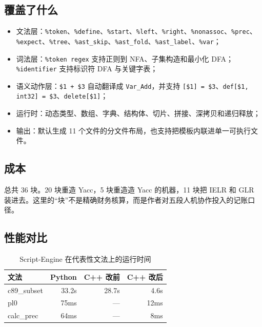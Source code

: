 \subsection{覆盖了什么}

\begin{itemize}
\item 文法层：\texttt{\%token}、\texttt{\%define}、\texttt{\%start}、\texttt{\%left}、\texttt{\%right}、\texttt{\%nonassoc}、\texttt{\%prec}、\texttt{\%expect}、\texttt{\%tree}、\texttt{\%ast\_skip}、\texttt{\%ast\_fold}、\texttt{\%ast\_label}、\texttt{\%var}；
\item 词法层：\texttt{\%token regex} 支持正则到 NFA、子集构造和最小化 DFA；\texttt{\%identifier} 支持标识符 DFA 与关键字表；
\item 语义动作层：\texttt{\$1 + \$3} 自动翻译成 \texttt{Var\_Add}，并支持 \texttt{[\$1] = \$3}、\texttt{def[\$1, int32] = \$3}、\texttt{delete[\$1]}；
\item 运行时：动态类型、数组、字典、结构体、切片、拼接、深拷贝和递归释放；
\item 输出：默认生成 11 个文件的分文件布局，也支持把模板内联进单一可执行文件。
\end{itemize}

\subsection{成本}

总共 36 块。20 块重造 Yacc，5 块重造造 Yacc 的机器，11 块把 IELR 和 GLR 装进去。这里的“块”不是精确财务核算，而是作者对五段人机协作投入的记账口径。

\subsection{性能对比}

\begin{table}[htbp]
	\centering
	\caption{Script-Engine 在代表性文法上的运行时间}
	\label{tab:app-parsergen-performance}
	\begin{tabular}{lrrr}
		\toprule
		文法 & Python & C++ 改前 & C++ 改后 \\
		\midrule
		c89\_subset & 33.2s & 28.7s & 4.6s \\
		pl0 & 75ms & --- & 12ms \\
		calc\_prec & 64ms & --- & 8ms \\
		\bottomrule
	\end{tabular}
\end{table}

